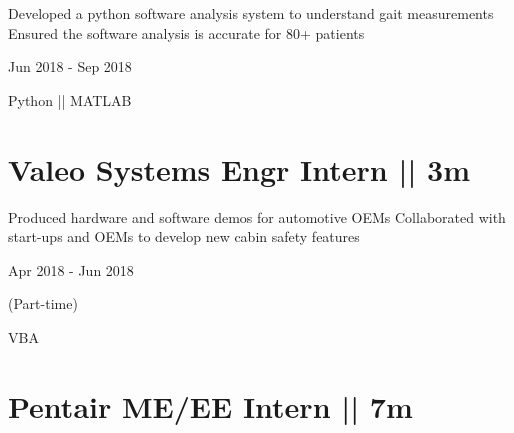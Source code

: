 \documentclass[letterpaper,10pt,oneside]{article}
\begin{document}
\begin{body}
\BulletItem
\vspace{-2.5ex}
\begin{detail}

\BulletItem
 Developed a python software analysis system to understand gait measurements
\BulletItem
 Ensured the software analysis is accurate for 80+ patients
\end{detail}

\begin{subtitle}
\vspace{-7.8ex}
{{Jun 2018 - Sep 2018}}
\end{subtitle}
\vspace{0ex}

\vspace{-1.5ex}
{
\vspace{1.8ex}
\color{cyan}\small
{Python || MATLAB} %
}
\vspace{-1.5ex}

\section
{\textbf{Valeo}
\newline
Systems Engr Intern || 3m}

\BulletItem
\vspace{-2.5ex}
\begin{detail}
\BulletItem
 Produced hardware and software demos for automotive OEMs
\BulletItem
 Collaborated with start-ups and OEMs to develop new cabin safety features
\end{detail}

\begin{subtitle}
\vspace{-7.8ex}
{{Apr 2018 - Jun 2018}}
\end{subtitle}

\begin{subtitle}
\vspace{-2.0ex}
{{(Part-time)}} 
\end{subtitle}

\vspace{-4ex}
{
\vspace{1.8ex}
\color{cyan}\small
{VBA} %
}
\vspace{-1.5ex}

\section
{\textbf{Pentair}
\newline
ME/EE Intern  || 7m}


\end{body}
\end{document}
